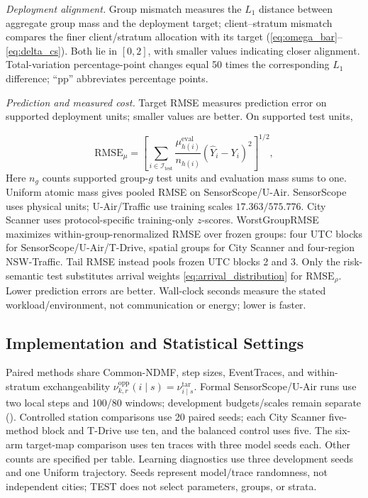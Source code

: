 \documentclass[letterpaper,journal]{IEEEtran}
\begin{document}
\noindent\textit{Deployment alignment.}
Group mismatch measures the $L_1$ distance between aggregate group mass and
the deployment target; client--stratum mismatch compares the finer client/stratum
allocation with its target (\eqref{eq:omega_bar}--\eqref{eq:delta_cs}). Both lie
in $[0,2]$, with smaller values indicating closer alignment. Total-variation percentage-point changes equal 50 times the corresponding
$L_1$ difference; ``pp'' abbreviates percentage points.

\noindent\textit{Prediction and measured cost.}
Target RMSE measures prediction error on supported deployment units; smaller
values are better. On supported test units,

\[
\mathrm{RMSE}_{\mu}=\left[\sum_{i\in\mathcal I_{\mathrm{test}}}
\frac{\mu^{\mathrm{eval}}_{h(i)}}{n_{h(i)}}(\widehat Y_i-Y_i)^2\right]^{1/2},
\]
Here $n_g$ counts supported group-$g$ test units and evaluation mass sums to one.
Uniform atomic mass gives pooled RMSE on SensorScope/U-Air. SensorScope uses
physical units; U-Air/Traffic use training scales $17.363/575.776$.
City Scanner uses protocol-specific training-only $z$-scores.
WorstGroupRMSE maximizes within-group-renormalized RMSE over frozen groups:
four UTC blocks for SensorScope/U-Air/T-Drive, spatial groups for City Scanner
and four-region NSW-Traffic. Tail RMSE instead pools frozen UTC blocks 2 and 3.
Only the risk-semantic test substitutes arrival weights
\eqref{eq:arrival_distribution} for $\mathrm{RMSE}_\rho$.
Lower prediction errors are better. Wall-clock seconds measure the stated
workload/environment, not communication or energy; lower is faster.

\subsection{Implementation and Statistical Settings}
\label{subsec:eval_implementation}

Paired methods share Common-NDMF, step sizes, EventTraces, and within-stratum exchangeability
$\nu^{\mathrm{opp}}_{k,r}(i\mid s)=\nu^{\mathrm{tar}}_{i\mid s}$.
Formal SensorScope/U-Air runs use two local steps and 100/80 windows; development
budgets/scales remain separate (). Controlled station
comparisons use 20 paired seeds; each City Scanner five-method block and
T-Drive use ten, and the balanced control uses five.  The six-arm target-map
comparison uses ten traces with three model seeds each.  Other counts are
specified per table.  Learning diagnostics use three development
seeds and one Uniform trajectory.  Seeds represent model/trace randomness,
not independent cities; TEST does not select parameters, groups, or strata.
\end{document}
